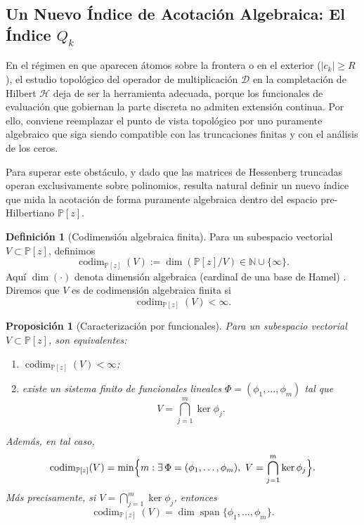 \documentclass[12pt,a4paper]{article}
\newtheorem{proposition}{Proposición}
\theoremstyle{definition}
\newtheorem{definition}{Definición}
\theoremstyle{remark}
\newcommand{\Poly}{\mathbb{P}[z]}
\newcommand{\D}{\mathcal{D}}
\begin{document}
\subsection{Un Nuevo Índice de Acotación Algebraica: El Índice $Q_k$}

En el régimen en que aparecen átomos sobre la frontera o en el exterior ($|c_k|\ge R$), el estudio topológico del operador de multiplicación $\D$ en la completación de Hilbert $\mathcal{H}$ deja de ser la herramienta adecuada, porque los funcionales de evaluación que gobiernan la parte discreta no admiten extensión continua. Por ello, conviene reemplazar el punto de vista topológico por uno puramente algebraico que siga siendo compatible con las truncaciones finitas y con el análisis de los ceros.

Para superar este obstáculo, y dado que las matrices de Hessenberg truncadas operan exclusivamente sobre polinomios, resulta natural definir un nuevo índice que mida la acotación de forma puramente algebraica dentro del espacio pre-Hilbertiano $\Poly$.

\begin{definition}[Codimensión algebraica finita]\label{def:codim_alg}
  Para un subespacio vectorial $V\subset \Poly$, definimos
  \[
    \operatorname{codim}_{\Poly}(V):=\dim(\Poly/V)\in \mathbb N\cup\{\infty\}.
  \]
  Aquí $\dim(\cdot)$ denota dimensión algebraica (cardinal de una base de Hamel) \cite{hormander1989linearfunctionalanalysis,Aizpuru2009Apuntes}.
  Diremos que $V$ es de codimensión algebraica finita si
  \[
    \operatorname{codim}_{\Poly}(V)<\infty.
  \]
\end{definition}

\begin{proposition}[Caracterización por funcionales]\label{prop:finite-codim-kernels}
  Para un subespacio vectorial $V\subset \Poly$, son equivalentes:
  \begin{enumerate}
    \item $\operatorname{codim}_{\Poly}(V)<\infty$;
    \item existe un sistema finito de funcionales lineales $\Phi=(\phi_1,\dots,\phi_m)$
          tal que
          \[
            V=\bigcap_{j=1}^m \ker \phi_j.
          \]
  \end{enumerate}
  Además, en tal caso,
  \[
    \operatorname{codim}_{\Poly}(V)
    =
    \min\Bigl\{m:\exists\,\Phi=(\phi_1,\dots,\phi_m),\
    V=\bigcap_{j=1}^m\ker\phi_j\Bigr\}.
  \]
  Más precisamente, si $V=\bigcap_{j=1}^m\ker\phi_j$, entonces
  \[
    \operatorname{codim}_{\Poly}(V)=\dim\operatorname{span}\{\phi_1,\dots,\phi_m\}.
  \]
\end{proposition}
\end{document}
